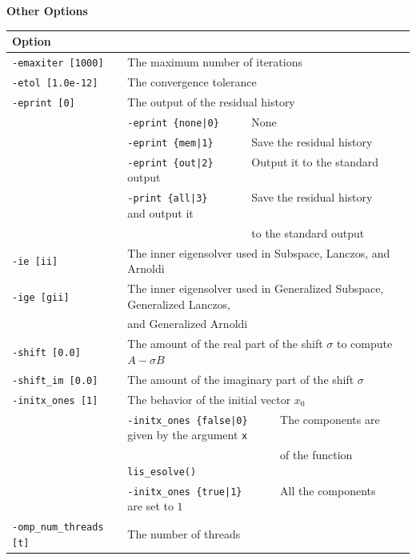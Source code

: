\documentclass[a4paper]{article}
\begin{document}
\\ \\
\begin{minipage}[t]{\textwidth}
\begin{center}
{\bf Other Options}\\
\begin{tabular}{l|ll}\hline\hline
Option &                          \\ \hline
\verb=-emaxiter [1000]= & The maximum number of iterations         \\ 
\verb=-etol [1.0e-12]=  & The convergence tolerance                \\
\verb=-eprint [0]=      & The output of the residual history                \\
                       & \verb=-eprint {none|0}     =  None \\
                       & \verb=-eprint {mem|1}      =  Save the residual history\\
                       & \verb=-eprint {out|2}      =  Output it to the standard output\\
                       & \verb=-print {all|3}       =  Save the residual history and output it \\
                       & \verb=                     =  to the standard output \\
\verb=-ie [ii]= & The inner eigensolver used in Subspace, Lanczos, and Arnoldi\\
\verb=-ige [gii]= & The inner eigensolver used in Generalized Subspace, Generalized Lanczos, \\
                       & and Generalized Arnoldi\\
\verb=-shift [0.0]= & The amount of the real part of the shift $\sigma$ to compute $A-\sigma B$ \\
\verb=-shift_im [0.0]= & The amount of the imaginary part of the shift $\sigma$ \\
\verb=-initx_ones [1]= & The behavior of the initial vector $x_{0}$  \\
                       & \verb=-initx_ones {false|0}     =  The components are given by the argument \verb=x= \\
                       & \verb=                          =  of the function \verb=lis_esolve()= \\
                       & \verb=-initx_ones {true|1}      =  All the components are set to $1$ \\
\verb=-omp_num_threads [t]= & The number of threads        \\ 

\end{tabular}
\end{center}
\end{minipage}
\end{document}
